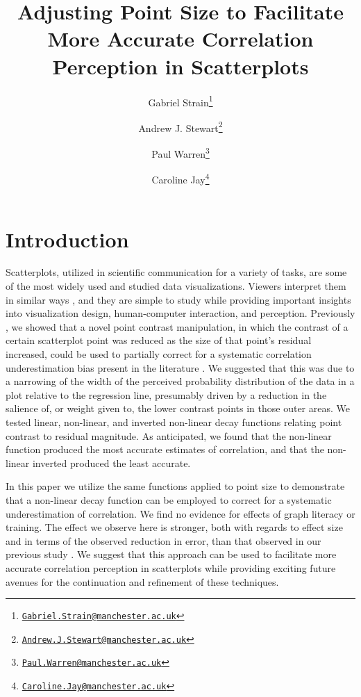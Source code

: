\documentclass{vgtc}                          %
\title{Adjusting Point Size to Facilitate More Accurate Correlation Perception in Scatterplots}
\author{Gabriel Strain\thanks{\href{mailto:Gabriel.Strain@manchester.ac.uk}{\nolinkurl{Gabriel.Strain@manchester.ac.uk}}} %
\and Andrew J. Stewart\thanks{\href{mailto:Andrew.J.Stewart@manchester.ac.uk}{\nolinkurl{Andrew.J.Stewart@manchester.ac.uk}}} %
\and Paul Warren\thanks{\href{mailto:Paul.Warren@manchester.ac.uk}{\nolinkurl{Paul.Warren@manchester.ac.uk}}} %
\and Caroline Jay\thanks{\href{mailto:Caroline.Jay@manchester.ac.uk}{\nolinkurl{Caroline.Jay@manchester.ac.uk}}}} %
\affiliation{\scriptsize The University of Manchester}
\begin{document}

\firstsection{}

\maketitle

\hypertarget{introduction}{%
\section{Introduction}\label{introduction}}

Scatterplots, utilized in scientific communication for a variety of tasks,
are some of the most widely used and studied data visualizations. Viewers
interpret them in similar ways \cite{kay_heer_2015}, and they are simple
to study while providing important insights into visualization
design, human-computer interaction, and perception. Previously \cite{strain_2023},
we showed that a novel point contrast manipulation, in which the contrast of a certain
scatterplot point was reduced as the size of that point's residual increased, could be
used to partially correct for a systematic correlation underestimation bias present in the
literature \cite{strahan_1978, bobko_1979, cleveland_1982, lane_1985, lauer_1989, 
collyer_1990, meyer_1992}. We suggested that this was due to a narrowing of the width
of the perceived probability distribution of the data in a plot relative to the regression line,
presumably driven by a reduction in the salience of, or weight given to, the lower
contrast points in those outer areas. We tested linear, non-linear,
and inverted non-linear decay functions relating point contrast to
residual magnitude. As anticipated, we found that the non-linear function produced
the most accurate estimates of correlation, and that the non-linear inverted produced
the least accurate.

In this paper we utilize the same functions applied to point size to demonstrate that
a non-linear decay function can be employed to correct for a systematic underestimation of correlation.
We find no evidence for effects of graph literacy or training.
The effect we observe here is stronger, both with regards to effect size
and in terms of the observed reduction in error, than that
observed in our previous study \cite{strain_2023}. We suggest that this
approach can be used to facilitate more accurate correlation
perception in scatterplots while providing exciting future avenues for the continuation
and refinement of these techniques.
\end{document}
